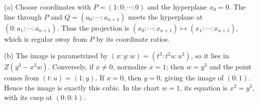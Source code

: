(a) Choose coordinates with $P=(1:0:\cdots:0)$ and the hyperplane $x_0=0$. The line through $P$ and $Q=(a_0:\cdots:a_{n+1})$ meets the hyperplane at $(0:a_1:\cdots:a_{n+1})$. Thus the projection is $(x_0:\cdots:x_{n+1})\mapsto(x_1:\cdots:x_{n+1})$, which is regular away from $P$ by its coordinate ratios.

(b) The image is parametrized by $(x:y:w)=(t^3:t^2u:u^3)$, so it lies in $Z(y^3-x^2w)$. Conversely, if $x\ne0$, normalize $x=1$; then $w=y^3$ and the point comes from $(t:u)=(1:y)$. If $x=0$, then $y=0$, giving the image of $(0:1)$. Hence the image is exactly this cubic. In the chart $w=1$, its equation is $x^2=y^3$, with its cusp at $(0:0:1)$.
